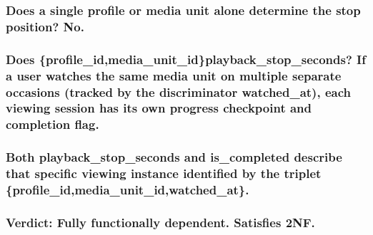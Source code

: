 \subsubsection{Does a single profile or media unit alone determine the stop position? No.}\label{does-a-single-profile-or-media-unit-alone-determine-the-stop-position-no.}

\subsubsection{Does \{profile\_\allowbreak{}id,media\_\allowbreak{}unit\_\allowbreak{}id\}playback\_\allowbreak{}stop\_\allowbreak{}seconds? If a user watches the same media unit on multiple separate occasions (tracked by the discriminator watched\_\allowbreak{}at), each viewing session has its own progress checkpoint and completion flag.}\label{does-profile_idmedia_unit_idplayback_stop_seconds-if-a-user-watches-the-same-media-unit-on-multiple-separate-occasions-tracked-by-the-discriminator-watched_at-each-viewing-session-has-its-own-progress-checkpoint-and-completion-flag.}

\subsubsection{Both playback\_\allowbreak{}stop\_\allowbreak{}seconds and is\_\allowbreak{}completed describe that specific viewing instance identified by the triplet \{profile\_\allowbreak{}id,media\_\allowbreak{}unit\_\allowbreak{}id,watched\_\allowbreak{}at\}.}\label{both-playback_stop_seconds-and-is_completed-describe-that-specific-viewing-instance-identified-by-the-triplet-profile_idmedia_unit_idwatched_at.}

\subsubsection{Verdict: Fully functionally dependent. Satisfies 2NF.}\label{verdict-fully-functionally-dependent.-satisfies-2nf.}

\subsubsection{}\label{section}

